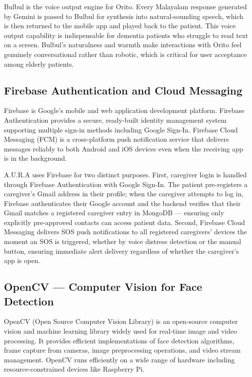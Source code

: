 Bulbul is the voice output engine for Orito. Every Malayalam response generated by Gemini is passed to Bulbul for synthesis into natural-sounding speech, which is then returned to the mobile app and played back to the patient. This voice output capability is indispensable for dementia patients who struggle to read text on a screen. Bulbul's naturalness and warmth make interactions with Orito feel genuinely conversational rather than robotic, which is critical for user acceptance among elderly patients.

\subsection{Firebase Authentication and Cloud Messaging}
Firebase is Google's mobile and web application development platform. Firebase Authentication provides a secure, ready-built identity management system supporting multiple sign-in methods including Google Sign-In. Firebase Cloud Messaging (FCM) is a cross-platform push notification service that delivers messages reliably to both Android and iOS devices even when the receiving app is in the background.

A.U.R.A uses Firebase for two distinct purposes. First, caregiver login is handled through Firebase Authentication with Google Sign-In. The patient pre-registers a caregiver's Gmail address in their profile; when the caregiver attempts to log in, Firebase authenticates their Google account and the backend verifies that their Gmail matches a registered caregiver entry in MongoDB --- ensuring only explicitly pre-approved contacts can access patient data. Second, Firebase Cloud Messaging delivers SOS push notifications to all registered caregivers' devices the moment an SOS is triggered, whether by voice distress detection or the manual button, ensuring immediate alert delivery regardless of whether the caregiver's app is open.

\subsection{OpenCV --- Computer Vision for Face Detection}
OpenCV (Open Source Computer Vision Library) is an open-source computer vision and machine learning library widely used for real-time image and video processing. It provides efficient implementations of face detection algorithms, frame capture from cameras, image preprocessing operations, and video stream management. OpenCV runs efficiently on a wide range of hardware including resource-constrained devices like Raspberry Pi.

